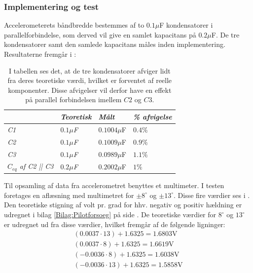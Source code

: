 \subsubsection{Implementering og test}
Accelerometerets båndbredde bestemmes af to $0.1\mu$F kondensatorer i parallelforbindelse, som derved vil give en samlet kapacitans på  $0.2\mu$F. De tre kondensatorer samt den samlede kapacitans måles inden implementering. Resultaterne fremgår i  :
\begin{table}[H]
	\centering
	\begin{tabular}{|l|l|l|l|} \cline{2-4} \multicolumn{1}{l|}{} & \textit{Teoretisk} & \textit{Målt} & \textit{\% afvigelse} \\ \hline
		\textit{C1}       & \textit{$0.1\mu$F} & $0.1004\mu$F  & $0.4\%$               \\ \hline		
		\textit{C2}       & \textit{$0.1\mu$F} & $0.1009\mu$F  & $0.9\%$               \\ \hline
		\textit{C3}       & \textit{$0.1\mu$F} & $0.0989\mu$F  & $1.1\%$               \\ \hline
		\textit{$C_{eq}$ af C2 || C3} & \textit{$0.2\mu$F} & $0.2002\mu$F  & $1\%$                \\ \hline
	\end{tabular}
	\caption{I tabellen ses det, at de tre kondensatorer afviger lidt fra deres teoretiske værdi, hvilket er forventet af reelle komponenter. Disse afvigelser vil derfor have en effekt på parallel forbindelsen imellem $C2$ og $C3$.}
	\label{Tab:Acc_kondensator}
\end{table}
\noindent Til opsamling af data fra accelerometret benyttes et multimeter. I testen foretages en aflæsning med multimetret for $\pm8^\circ$ og $\pm13^\circ$. Disse fire værdier ses i . Den teoretiske stigning af volt pr. grad for hhv. negativ og positiv hældning er udregnet i bilag \ref{Bilag:Pilotforsoeg} på side \pageref{Bilag:Pilotforsoeg}. De teoretiske værdier for $8^\circ$ og $13^\circ$ er udregnet ud fra disse værdier, hvilket fremgår af de følgende ligninger:
\begin{align}
(0.0037 \cdot 13) + 1.6325 = 1.6803\text{V} \\
(0.0037 \cdot 8) + 1.6325 = 1.6619\text{V}  \\
(-0.0036 \cdot 8) + 1.6325 = 1.6038\text{V}  \\
(-0.0036 \cdot 13) + 1.6325 = 1.5858\text{V}
\end{align}
